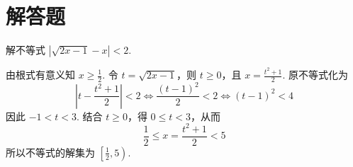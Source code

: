 \section{解答题}
\begin{problem}
解不等式 \(\left|\sqrt{2x-1}-x\right|<2\).

\begin{solution}
由根式有意义知 \(x\geqslant\frac{1}{2}\). 令 \(t=\sqrt{2x-1}\)，则 \(t\geqslant0\)，且 \(x=\frac{t^{2}+1}{2}\). 原不等式化为
\[
\left|t-\frac{t^{2}+1}{2}\right|<2
\Longleftrightarrow \frac{(t-1)^{2}}{2}<2
\Longleftrightarrow (t-1)^{2}<4
\]
因此 \(-1<t<3\). 结合 \(t\geqslant0\)，得 \(0\leqslant t<3\)，从而
\[
\frac{1}{2}\leqslant x=\frac{t^{2}+1}{2}<5
\]
所以不等式的解集为 \(\left[\frac{1}{2},5\right)\).
\end{solution}
\end{problem}

